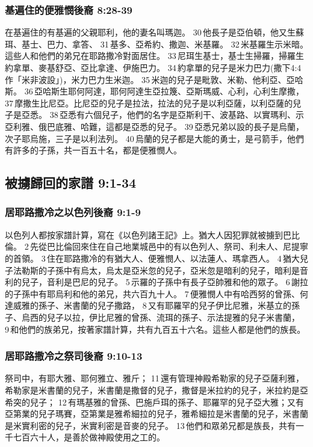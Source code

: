 \subsubsection{基遍住的便雅憫後裔 8:28-39}
在基遍住的有基遍的父親耶利，他的妻名叫瑪迦。 30 他長子是亞伯頓，他又生蘇珥、基士、巴力、拿答、 31 基多、亞希約、撒迦、米基羅。 32 米基羅生示米暗。這些人和他們的弟兄在耶路撒冷對面居住。 33 尼珥生基士，基士生掃羅，掃羅生約拿單、麥基舒亞、亞比拿達、伊施巴力。 34 約拿單的兒子是米力巴力(撒下4:4作「米非波設」)，米力巴力生米迦。 35 米迦的兒子是毗敦、米勒、他利亞、亞哈斯。 36 亞哈斯生耶何阿達，耶何阿達生亞拉篾、亞斯瑪威、心利，心利生摩撒， 37 摩撒生比尼亞。比尼亞的兒子是拉法，拉法的兒子是以利亞薩，以利亞薩的兒子是亞悉。 38 亞悉有六個兒子，他們的名字是亞斯利干、波基路、以實瑪利、示亞利雅、俄巴底雅、哈難，這都是亞悉的兒子。 39 亞悉兄弟以設的長子是烏蘭，次子耶烏施，三子是以利法列。 40 烏蘭的兒子都是大能的勇士，是弓箭手，他們有許多的子孫，共一百五十名，都是便雅憫人。

\subsection{被擄歸回的家譜 9:1-34 }
\subsubsection{居耶路撒冷之以色列後裔 9:1-9}
以色列人都按家譜計算，寫在《以色列諸王記》上。猶大人因犯罪就被擄到巴比倫。 2 先從巴比倫回來住在自己地業城邑中的有以色列人、祭司、利未人、尼提寧的首領。 3 住在耶路撒冷的有猶大人、便雅憫人、以法蓮人、瑪拿西人。 4 猶大兒子法勒斯的子孫中有烏太，烏太是亞米忽的兒子，亞米忽是暗利的兒子，暗利是音利的兒子，音利是巴尼的兒子。 5 示羅的子孫中有長子亞帥雅和他的眾子。 6 謝拉的子孫中有耶烏利和他的弟兄，共六百九十人。 7 便雅憫人中有哈西努的曾孫、何達威雅的孫子、米書蘭的兒子撒路， 8 又有耶羅罕的兒子伊比尼雅，米基立的孫子、烏西的兒子以拉，伊比尼雅的曾孫、流珥的孫子、示法提雅的兒子米書蘭， 9 和他們的族弟兄，按著家譜計算，共有九百五十六名。這些人都是他們的族長。

\subsubsection{居耶路撒冷之祭司後裔 9:10-13}
祭司中，有耶大雅、耶何雅立、雅斤； 11 還有管理神殿希勒家的兒子亞薩利雅，希勒家是米書蘭的兒子，米書蘭是撒督的兒子，撒督是米拉約的兒子，米拉約是亞希突的兒子； 12 有瑪基雅的曾孫、巴施戶珥的孫子、耶羅罕的兒子亞大雅；又有亞第業的兒子瑪賽，亞第業是雅希細拉的兒子，雅希細拉是米書蘭的兒子，米書蘭是米實利密的兒子，米實利密是音麥的兒子。 13 他們和眾弟兄都是族長，共有一千七百六十人，是善於做神殿使用之工的。

